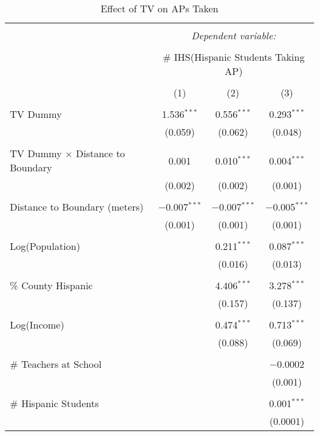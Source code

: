 
\begin{table}[!htbp] \centering 
  \caption{Effect of TV on APs Taken} 
  \label{} 
\begin{tabular}{@{\extracolsep{-2pt}}lccc} 
\\[-1.8ex]\hline 
\hline \\[-1.8ex] 
 & \multicolumn{3}{c}{\textit{Dependent variable:}} \\ 
\cline{2-4} 
\\[-1.8ex] & \multicolumn{3}{c}{\# IHS(Hispanic Students Taking AP)} \\ 
\\[-1.8ex] & (1) & (2) & (3)\\ 
\hline \\[-1.8ex] 
 TV Dummy & 1.536$^{***}$ & 0.556$^{***}$ & 0.293$^{***}$ \\ 
  & (0.059) & (0.062) & (0.048) \\ 
  & & & \\ 
 TV Dummy $\times$ Distance to Boundary & 0.001 & 0.010$^{***}$ & 0.004$^{***}$ \\ 
  & (0.002) & (0.002) & (0.001) \\ 
  & & & \\ 
 Distance to Boundary (meters) & $-$0.007$^{***}$ & $-$0.007$^{***}$ & $-$0.005$^{***}$ \\ 
  & (0.001) & (0.001) & (0.001) \\ 
  & & & \\ 
 Log(Population) &  & 0.211$^{***}$ & 0.087$^{***}$ \\ 
  &  & (0.016) & (0.013) \\ 
  & & & \\ 
 \% County Hispanic &  & 4.406$^{***}$ & 3.278$^{***}$ \\ 
  &  & (0.157) & (0.137) \\ 
  & & & \\ 
 Log(Income) &  & 0.474$^{***}$ & 0.713$^{***}$ \\ 
  &  & (0.088) & (0.069) \\ 
  & & & \\ 
 \# Teachers at School &  &  & $-$0.0002 \\ 
  &  &  & (0.001) \\ 
  & & & \\ 
 \# Hispanic Students &  &  & 0.001$^{***}$ \\ 
  &  &  & (0.0001) \\ 

\end{tabular}
\end{table}
